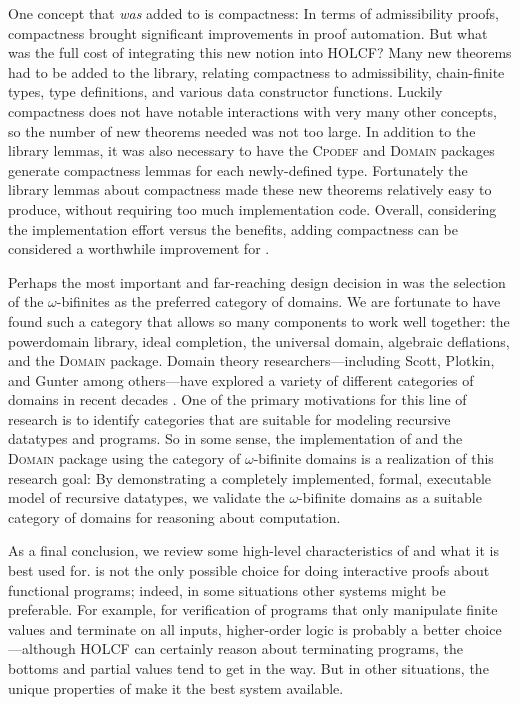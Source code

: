 One concept that \emph{was} added to  is compactness: In terms of admissibility proofs, compactness brought significant improvements in proof automation. But what was the full cost of integrating this new notion into HOLCF? Many new theorems had to be added to the library, relating compactness to admissibility, chain-finite types, type definitions, and various data constructor functions. Luckily compactness does not have notable interactions with very many other concepts, so the number of new theorems needed was not too large. In addition to the library lemmas, it was also necessary to have the \textsc{Cpodef} and \textsc{Domain} packages generate compactness lemmas for each newly-defined type. Fortunately the library lemmas about compactness made these new theorems relatively easy to produce, without requiring too much implementation code. Overall, considering the implementation effort versus the benefits, adding compactness can be considered a worthwhile improvement for .

Perhaps the most important and far-reaching design decision in  was the selection of the $\omega$-bifinites as the preferred category of domains. We are fortunate to have found such a category that allows so many components to work well together: the powerdomain library, ideal completion, the universal domain, algebraic deflations, and the \textsc{Domain} package. Domain theory researchers---including Scott, Plotkin, and Gunter among others---have explored a variety of different categories of domains in recent decades \cite{plotkin76powerdomain, gunter90semantic, abramsky94domain, Scott08}. One of the primary motivations for this line of research is to identify categories that are suitable for modeling recursive datatypes and programs. So in some sense, the implementation of  and the \textsc{Domain} package using the category of $\omega$-bifinite domains is a realization of this research goal: By demonstrating a completely implemented, formal, executable model of recursive datatypes, we validate the $\omega$-bifinite domains as a suitable category of domains for reasoning about computation.

As a final conclusion, we review some high-level characteristics of  and what it is best used for.  is not the only possible choice for doing interactive proofs about functional programs; indeed, in some situations other systems might be preferable. For example, for verification of programs that only manipulate finite values and terminate on all inputs, higher-order logic is probably a better choice---although HOLCF can certainly reason about terminating programs, the bottoms and partial values tend to get in the way. But in other situations, the unique properties of  make it the best system available.

